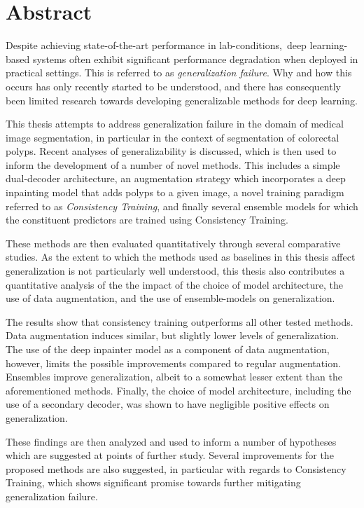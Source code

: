 \chapter*{Abstract}
    Despite achieving state-of-the-art performance in lab-conditions, deep learning-based systems often exhibit significant performance degradation when deployed in practical settings. This is referred to as \textit{generalization failure}. Why and how this occurs has only recently started to be understood, and there has consequently been limited research towards developing generalizable methods for deep learning. 
    
    This thesis attempts to address generalization failure in the domain of medical image segmentation, in particular in the context of  segmentation of colorectal polyps. Recent analyses of generalizability is discussed, which is then used to inform the development of a number of novel methods. This includes a simple dual-decoder architecture, an augmentation strategy which incorporates a deep inpainting model that adds polyps to a given image, a novel training paradigm referred to as \textit{Consistency Training}, and finally several ensemble models for which the constituent predictors are trained using Consistency Training.
    
    These methods are then evaluated quantitatively through several comparative studies. As the extent to which the methods used as baselines in this thesis affect generalization is not particularly well understood, this thesis also contributes a quantitative analysis of the the impact of the choice of model architecture, the use of data augmentation, and the use of ensemble-models on generalization. 
    
    The results show that consistency training outperforms all other tested methods. Data augmentation induces similar, but slightly lower levels of generalization. The use of the deep inpainter model as a component of data augmentation, however, limits the possible improvements compared to regular augmentation. Ensembles improve generalization, albeit to a somewhat lesser extent than the aforementioned methods. Finally, the choice of model architecture, including the use of a secondary decoder, was shown to have negligible positive effects on generalization. 
    
    These findings are then analyzed and used to inform a number of hypotheses which are suggested at points of further study. Several improvements for the proposed methods are also suggested, in particular with regards to Consistency Training, which shows significant promise towards further mitigating generalization failure. 